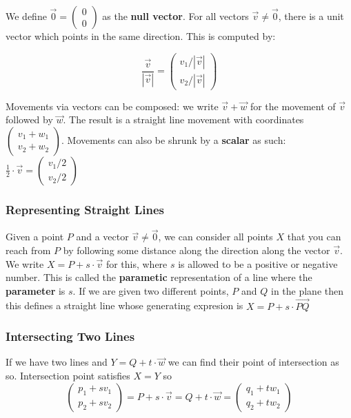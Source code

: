 \documentclass{article}
\begin{document}
	\par We define $\overrightarrow{0} = \left( \begin{array}{c} 0 \\ 0 \end{array} \right)$ as the \textbf{null vector}. For all vectors $\overrightarrow{v} \neq \overrightarrow{0}$, there is a unit vector which points in the same direction. This is computed by:
	
	\[ \frac{\overrightarrow{v}}{|\overrightarrow{v}|} = \left( \begin{array}{c} v_{1} / |\overrightarrow{v}| \\ v_{2} / |\overrightarrow{v}| \end{array} \right) \]
	
	\par 
	Movements via vectors can be composed: we write $\overrightarrow{v} + \overrightarrow{w}$ for the movement of $\overrightarrow{v}$ followed by $\overrightarrow{w}$. The result is a straight line movement with coordinates $\left( \begin{array}{c} v_{1} + w_{1} \\ v_{2} + w_{2} \end{array} \right)$. Movements can also be shrunk by a \textbf{scalar} as such:
	$\frac{1}{2} \cdot \overrightarrow{v} = \left( \begin{array}{c} v_{1}/2 \\ v_{2}/2 \end{array} \right)$
	
	\subsubsection{Representing Straight Lines}
	Given a point $P$ and a vector $\overrightarrow{v} \neq \overrightarrow{0}$, we can consider all points $X$ that you can reach from $P$ by following some distance along the direction along the vector $\overrightarrow{v}$. We write $X = P + s \cdot \overrightarrow{v}$ for this, where $s$ is allowed to be a positive or negative number. This is called the \textbf{parametic} representation of a line where the \textbf{parameter} is $s$. If we are given two different points, $P$ and $Q$ in the plane then this defines a straight line whose generating expresion is $X = P + s \cdot \overrightarrow{PQ}$
	
	\subsubsection{Intersecting Two Lines}
	If we have two lines  and $Y = Q + t \cdot \overrightarrow{w}$ we can find their point of intersection as so.
	Intersection point satisfies $X = Y$ so 
	\[ \left( \begin{array}{c} p_{1} + sv_{1} \\ p_{2} + sv_{2} \end{array} \right) = P + s \cdot \overrightarrow{v} = Q + t \cdot \overrightarrow{w} = \left( \begin{array}{c} q_{1} + tw_{1} \\ q_{2} + tw_{2} \end{array} \right) \]
	
\end{document}
